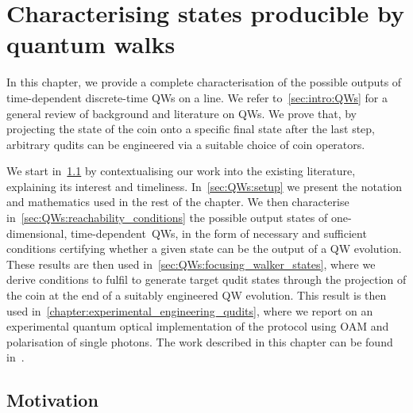 
\chapter{Characterising states producible by quantum walks}
\label{chapter:quantum_walks}

In this chapter, we provide a complete characterisation of the possible outputs of time-dependent discrete-time \acfp{QW} on a line. We refer to~\cref{sec:intro:QWs} for a general review of background and literature on \acp{QW}.
We prove that, by projecting the state of the coin onto a specific final state after the last step, arbitrary qudits can be engineered via a suitable choice of coin operators.

We start in~\cref{sec:QWs:motivation} by contextualising our work into the existing literature, explaining its interest and timeliness.
In~\cref{sec:QWs:setup} we present the notation and mathematics used in the rest of the chapter.
We then characterise in~\cref{sec:QWs:reachability_conditions} the possible output states of one-dimensional, time-dependent~\acp{QW}, in the form of necessary and sufficient conditions certifying whether a given state can be the output of a \ac{QW} evolution.
These results are then used in~\cref{sec:QWs:focusing_walker_states}, where we derive conditions to fulfil to generate target qudit states through the projection of the coin at the end of a suitably engineered QW evolution.
This result is then used in~\cref{chapter:experimental_engineering_qudits}, where we report on an experimental quantum optical implementation of the protocol using \acf{OAM} and polarisation of single photons.
The work described in this chapter can be found in~\cite{innocenti2017quantum}.

\section{Motivation}
\label{sec:QWs:motivation}

